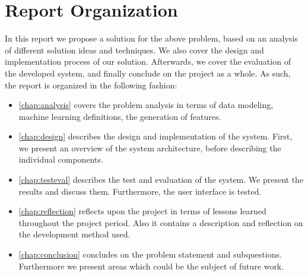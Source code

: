 \section{Report Organization}
In this report we propose a solution for the above problem, based on an analysis of different solution ideas and techniques. We also cover the design and implementation process of our solution. Afterwards, we cover the evaluation of the developed system, and finally conclude on the project as a whole. As such, the report is organized in the following fashion:

\begin{itemize}
	\item \cref{chap:analysis} covers the problem analysis in terms of data modeling, machine learning definitions, the generation of features.
  \item \cref{chap:design} describes the design and implementation of the system. First, we present an overview of the system architecture, before describing the individual components.
  \item \cref{chap:testeval} describes the test and evaluation of the system. We present the results and discuss them. Furthermore, the user interface is tested.
  \item \cref{chap:reflection} reflects upon the project in terms of lessons learned throughout the project period. Also it contains a description and reflection on the development method used.
  \item \cref{chap:conclusion} concludes on the problem statement and subquestions. Furthermore we present areas which could be the subject of future work.
\end{itemize}


